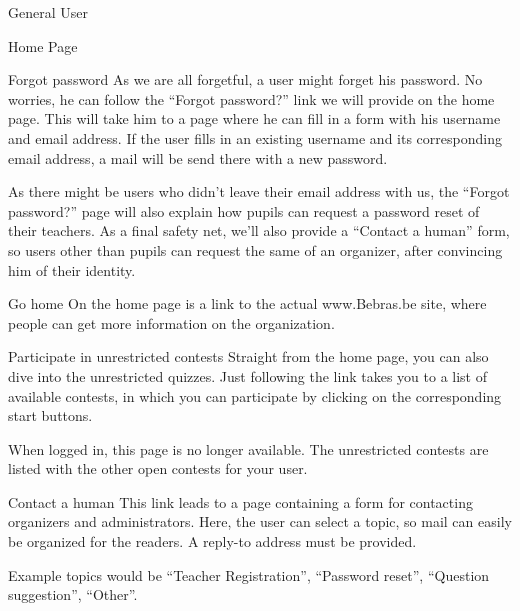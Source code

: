 \begin{section}{General User}
\begin{subsection}{Home Page}
        \begin{subsubsection}{Forgot password}
            As we are all forgetful, a user might forget his password. No
            worries, he can follow the ``Forgot password?'' link we will provide
            on the home page. This will take him to a page where he can fill in
            a form with his username and email address. If the user fills in an
            existing username and its corresponding email address, a mail will
            be send there with a new password.

            As there might be users who didn't leave their email address with
            us, the ``Forgot password?'' page will also explain how pupils can
            request a password reset of their teachers. As a final safety net,
            we'll also provide a ``Contact a human'' form, so users other than
            pupils can request the same of an organizer, after convincing him of
            their identity.
        \end{subsubsection}

        \begin{subsubsection}{Go home}
            On the home page is a link to the actual www.Bebras.be site, where
            people can get more information on the organization.
        \end{subsubsection}

        \begin{subsubsection}{Participate in unrestricted contests}
            Straight from the home page, you can also dive into the unrestricted
            quizzes. Just following the link takes you to a list of available
            contests, in which you can participate by clicking on the
            corresponding start buttons.

            When logged in, this page is no longer available. The unrestricted
            contests are listed with the other open contests for your user.
        \end{subsubsection}

        \begin{subsubsection}{Contact a human}
            This link leads to a page containing a form for contacting organizers
            and administrators. Here, the user can select a topic, so mail can
            easily be organized for the readers. A reply-to address must be
            provided.

            Example topics would be ``Teacher Registration'', ``Password
            reset'', ``Question suggestion'', ``Other''.
        \end{subsubsection}


\end{subsection}
\end{section}

